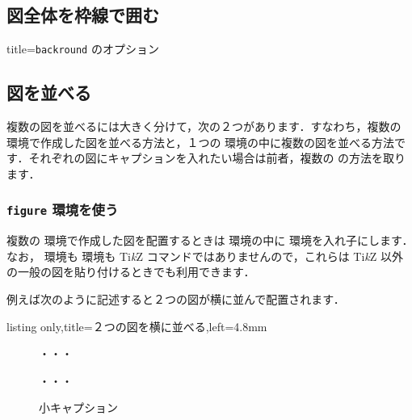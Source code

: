 \documentclass[../geometrymemo.tex]{subfiles}
\begin{document}
\subsection{図全体を枠線で囲む}

\begin{tcblisting}{title=\texttt{backround} のオプション}
\end{tcblisting}

\subsection{図を並べる}

複数の図を並べるには大きく分けて，次の２つがあります．すなわち，複数の  環境で作成した図を並べる方法と，１つの  環境の中に複数の図を並べる方法です．それぞれの図にキャプションを入れたい場合は前者，複数の  の方法を取ります．

\subsubsection{\texttt{figure} 環境を使う}

複数の  環境で作成した図を配置するときは  環境の中に  環境を入れ子にします．なお，  環境も  環境も Ti\textit{k}Z コマンドではありませんので，これらは Ti\textit{k}Z 以外の一般の図を貼り付けるときでも利用できます．

例えば次のように記述すると２つの図が横に並んで配置されます．
\begin{tcblisting}{listing only,title=２つの図を横に並べる,left=4.8mm}
    \begin{figure}
        \begin{minipage}[位置]{横の長さ}
            ・・・
        \end{minipage}
        \caption{小キャプション}
        \begin{minipage}[位置]{横の長さ}
            ・・・
        \end{minipage}
        \caption{小キャプション}
    \end{figure}
\end{tcblisting}
\end{document}
